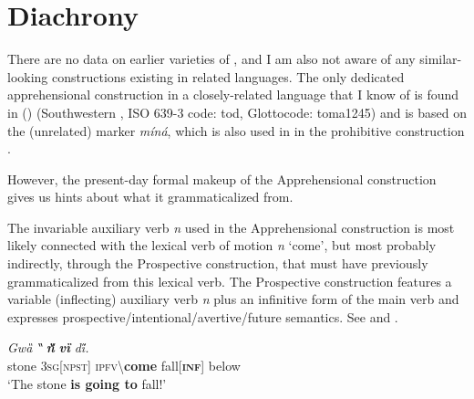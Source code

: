 \documentclass[output=paper,colorlinks,citecolor=brown]{langscibook}
\begin{document}
\section{Diachrony}
\label{sec:fedotov:diachrony}

There are no data on earlier varieties of , and I am also not aware of any similar-looking constructions existing in related languages. The only dedicated apprehensional construction in a closely-related language that I know of is found in  () (Southwestern , ISO 639-3 code: tod, Glottocode: toma1245) and is based on the (unrelated) marker \textit{míná}, which is also used in  in the prohibitive construction \parencite[378, 379]{mishchenko2017}.

However, the present-day formal makeup of the  Apprehensional construction gives us hints about what it grammaticalized from.

The invariable auxiliary verb \textit{n{\ù}} used in the Apprehensional construction is most likely connected with the lexical verb of motion \textit{n{\ù}} `come', but most probably indirectly, through the Prospective construction, that must have previously grammaticalized from this lexical verb. The Prospective construction features a variable (inflecting) auxiliary verb \textit{n{\ù}} plus an infinitive form of the main verb and expresses prospective\slash intentional\slash avertive\slash future semantics. See  and .


\ea \label{ex:Fed67}
\gll \textit{Gwȁ} \textit{‶} \textit{\textbf{n{\ȕ}}} \textit{\textbf{vȉ}} \textit{di̋.} \\
stone \textsc{3sg[npst]} \textsc{ipfv\backslash}\textbf{come} fall\textsc{[\textbf{inf}]} below \\
 `The stone \textbf{is going to} fall!'
\z
\end{document}

